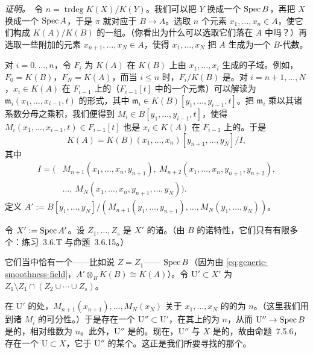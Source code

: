 \emph{证明。}\ 令 $n=\operatorname{trdeg}K(X)/K(Y)$。我们可以把 $Y$ 换成一个\trAffine\trOpenSubset{} $\operatorname{Spec} B$，再把 $X$ 换成一个\trAffine\trOpenSubset{} $\operatorname{Spec} A$，于是 $\pi$ 就对应于\trRingMorphism{} $B\to A$。选取 $n$ 个元素 $x_1,\dots,x_n\in A$，使它们构成 $K(A)/K(B)$ 的一组\trTranscendenceBase。（你看出为什么可以选取它们落在 $A$ 中吗？）再选取一些附加的元素 $x_{n+1},\dots,x_N\in A$，使得 $x_1,\dots,x_N$ 把 $A$ 生成为一个 $B$-代数。

对 $i=0,\dots,n$，令 $F_i$ 为 $K(A)$ 在 $K(B)$ 上由 $x_1,\dots,x_i$ 生成的子域。例如，$F_0=K(B)$，$F_N=K(A)$，而当 $i\le n$ 时，$F_i/K(B)$ 是\trPurelyTranscendental\trFieldExtension。对 $i=n+1,\dots,N$，$x_i\in K(A)$ 在 $F_{i-1}$ 上的\trMinimalPolynomial（$F_{i-1}[t]$ 中的一个元素）可以解读为 $\mathfrak{m}_i(x_1,\dots,x_{i-1},t)$ 的形式，其中 $\mathfrak{m}_i\in K(B)[y_1,\dots,y_{i-1},t]$。把 $\mathfrak{m}_i$ 乘以其诸系数分母之乘积，我们便得到 $M_i\in B[y_1,\dots,y_{i-1},t]$，使得 $M_i(x_1,\dots,x_{i-1},t)\in F_{i-1}[t]$ 也是 $x_i\in K(A)$ 在 $F_{i-1}$ 上的\trMinimalPolynomial。于是
\begin{equation*}
K(A)=K(B)(x_1,\dots,x_n)[y_{n+1},\dots,y_N]/I,
\tag{21.6.5.1}\label{eq:generic-smoothness-field}
\end{equation*}
其中
\[
\begin{aligned}
I=\bigl(&M_{n+1}(x_1,\dots,x_n,y_{n+1}),\ M_{n+2}(x_1,\dots,x_n,y_{n+1},y_{n+2}),\\
&\dots,\ M_N(x_1,\dots,x_n,y_{n+1},\dots,y_N)\bigr).
\end{aligned}
\]
定义 $A':=B[y_1,\dots,y_N]/(M_{n+1}(y_1,\dots,y_{n+1}),\dots,M_N(y_1,\dots,y_N))$。

令 $X':=\operatorname{Spec} A'$。设 $Z_1,\dots,Z_s$ 是 $X'$ 的诸\trIrreducibleComponent。（由 $B$ 的诺特性，它们只有有限多个：\mbox{练习~3.6.T} 与\mbox{命题~3.6.15}。）

它们当中恰有一个——比如说 $Z=Z_1$——\trDominant{} $\operatorname{Spec} B$（因为由 \eqref{eq:generic-smoothness-field}，$A'\otimes_B K(B)\cong K(A)$）。令 $\mathrm{U}'\subset X'$ 为\trOpenSubset{} $Z_1\setminus Z_1\cap(Z_2\cup\cdots\cup Z_s)$。

在 $\mathrm{U}'$ 的\trGenericPoint{}处，$M_{n+1}(x_{n+1}),\dots,M_N(x_N)$ 关于 $x_1,\dots,x_N$ 的\trJacobianMatrix{}的\trCorank{}为 $n$。（这里我们用到诸\trMinimalPolynomial{} $M_i$ 的可分性。）于是存在一个\trOpenSubset{} $\mathrm{U}''\subset\mathrm{U}'$，在其上\trJacobianMatrix{}的\trCorank{}为 $n$，从而 $\mathrm{U}''\to\operatorname{Spec} B$ 是\trSmooth{}的，相对维数为 $n$。此外，$\mathrm{U}''$ 是\trIrreducible{}的。现在，$\mathrm{U}''$ 与 $X$ 是\trBirational{}的，故由\mbox{命题~7.5.6}，存在一个\trOpenSubset{} $\mathrm{U}\subset X$，它\trIsomorphic{}于 $\mathrm{U}''$ 的某个\trOpenSubset。这正是我们所要寻找的那个\trOpenSubset。

